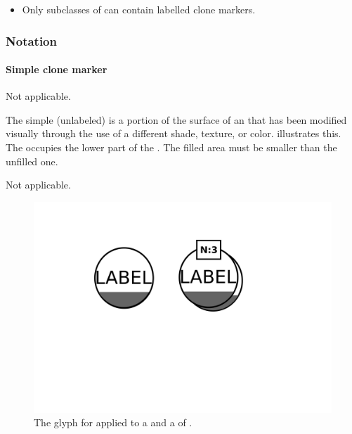 \begin{itemize}
\item Only subclasses of  can contain
labelled clone markers.
\end{itemize}

\subsubsection{Notation}

\paragraph{Simple clone marker}

\begin{glyphDescription}

\glyphSboTerm Not applicable.

\glyphContainer The simple (unlabeled)  is a
portion of the surface of an  that has been modified
visually through the use of a different shade, texture, or color.
 illustrates this.  The 
occupies the lower part of the . The filled area must be
smaller than the unfilled one.

\glyphLabel Not applicable.

\end{glyphDescription}

\begin{figure}[H]
  \centering
  \includegraphics[scale = 0.3]{images/simpleCloneMarker}
  \caption{The \PD glyph for  applied to a  and a  of .}
  \label{fig:simpleCloneMarker}
\end{figure}

